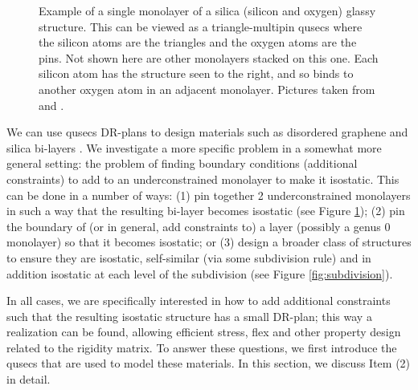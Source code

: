 \begin{figure}
    \caption{Example of a single monolayer of a silica (silicon and oxygen) glassy structure. This can be viewed as a triangle-multipin qusecs where the silicon atoms are the triangles and the oxygen atoms are the pins. Not shown here are other monolayers stacked on this one. Each silicon atom has the structure seen to the right, and so binds to another oxygen atom in an adjacent monolayer. Pictures taken from \cite{silica_figure} and \cite{tetra_silica_figure}.}
    \label{fig:silica_glass}
\end{figure}


We can use qusecs DR-plans to design materials such as disordered graphene and silica bi-layers \cite{silica_bilayers} \cite{sructure_of_2d_glass}. We investigate a more specific problem in a somewhat more general setting: the problem of finding boundary conditions (additional constraints) to add to an underconstrained monolayer to make it isostatic. This can be done in a number of ways: (1) pin together 2 underconstrained monolayers in such a way that the resulting bi-layer becomes isostatic (see Figure \ref{fig:silica_glass}); (2) pin the boundary of (or in general, add constraints to) a layer (possibly a genus 0 monolayer) so that it becomes isostatic; or (3) design a broader class of structures to ensure they are isostatic, self-similar (via some subdivision rule) and in addition isostatic at each level of the subdivision (see Figure \ref{fig:subdivision}).

In all cases, we are specifically interested in how to add additional constraints such that the resulting isostatic structure has a small DR-plan; this way a realization can be found, allowing efficient stress, flex and other property design related to the rigidity matrix. To answer these questions, we first introduce the qusecs that are used to model these materials. In this section, we discuss Item (2) in detail.


